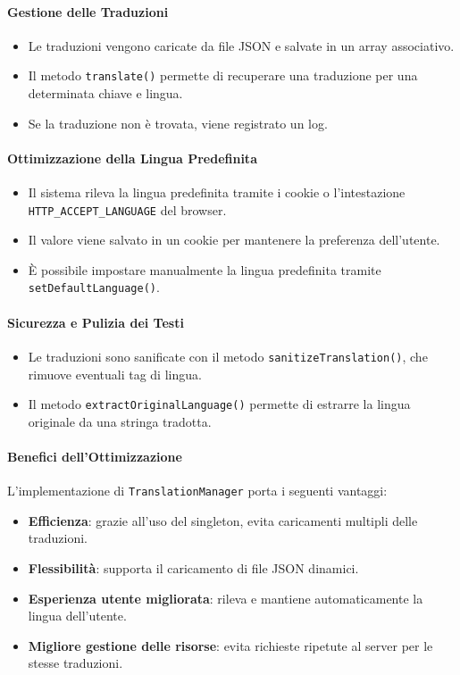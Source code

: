 \paragraph{Gestione delle Traduzioni}
\begin{itemize}
    \item Le traduzioni vengono caricate da file JSON e salvate in un array associativo.
    \item Il metodo \texttt{translate()} permette di recuperare una traduzione per una determinata chiave e lingua.
    \item Se la traduzione non \`e trovata, viene registrato un log.
\end{itemize}

\paragraph{Ottimizzazione della Lingua Predefinita}
\begin{itemize}
    \item Il sistema rileva la lingua predefinita tramite i cookie o l'intestazione \texttt{HTTP\_ACCEPT\_LANGUAGE} del browser.
    \item Il valore viene salvato in un cookie per mantenere la preferenza dell'utente.
    \item \`E possibile impostare manualmente la lingua predefinita tramite \texttt{setDefaultLanguage()}.
\end{itemize}

\paragraph{Sicurezza e Pulizia dei Testi}
\begin{itemize}
    \item Le traduzioni sono sanificate con il metodo \texttt{sanitizeTranslation()}, che rimuove eventuali tag di lingua.
    \item Il metodo \texttt{extractOriginalLanguage()} permette di estrarre la lingua originale da una stringa tradotta.
\end{itemize}

\paragraph{Benefici dell'Ottimizzazione}
L'implementazione di \texttt{TranslationManager} porta i seguenti vantaggi:

\begin{itemize}
    \item \textbf{Efficienza}: grazie all'uso del singleton, evita caricamenti multipli delle traduzioni.
    \item \textbf{Flessibilit\`a}: supporta il caricamento di file JSON dinamici.
    \item \textbf{Esperienza utente migliorata}: rileva e mantiene automaticamente la lingua dell'utente.
    \item \textbf{Migliore gestione delle risorse}: evita richieste ripetute al server per le stesse traduzioni.
\end{itemize}

